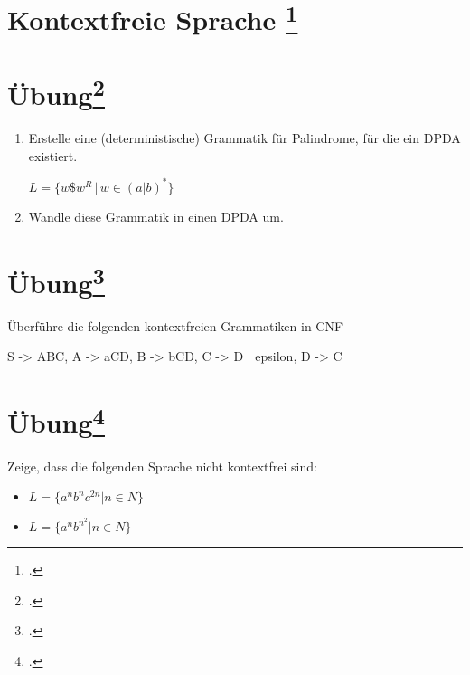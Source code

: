 \documentclass{lehramt-informatik-aufgabe}
\begin{document}
\let\m=\liMenge

\section{Kontextfreie Sprache
\footcite{theo:fs:2}}

\section{Übung\footcite[Seite 34]{theo:fs:2}}

\begin{enumerate}
\item Erstelle eine (deterministische) Grammatik für Palindrome, für die
ein DPDA existiert.

$L = \{ w \$ w^R \, | \, w \in (a|b)^* \}$

\item Wandle diese Grammatik in einen DPDA um.
\end{enumerate}

%

\section{Übung\footcite[Seite 37]{theo:fs:2}}

Überführe die folgenden kontextfreien Grammatiken in CNF

\begin{liProduktionsRegeln}
S -> ABC,
A -> aCD,
B -> bCD,
C -> D | epsilon,
D -> C
\end{liProduktionsRegeln}

%

\section{Übung\footcite[Seite 43]{theo:fs:2}}

Zeige, dass die folgenden Sprache nicht kontextfrei sind:

\begin{itemize}
\item $L = \{ a^n b^n c^{2n} | n \in N \}$
\item $L = \{ a^n b^{n^2} | n \in N \}$
\end{itemize}
\end{document}
